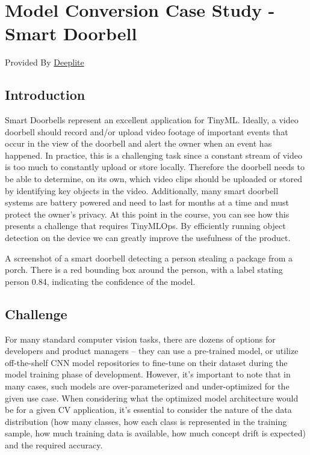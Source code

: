 {{{{{    
\section{Model Conversion Case Study - Smart Doorbell}

Provided By \href{}{Deeplite}

\subsection{Introduction}

    Smart Doorbells represent an excellent application for TinyML. Ideally, a video doorbell should record and/or upload video footage of important events that occur in the view of the doorbell and alert the owner when an event has happened. In practice, this is a challenging task since a constant stream of video is too much to constantly upload or store locally. Therefore the doorbell needs to be able to determine, on its own, which video clips should be uploaded or stored by identifying key objects in the video. Additionally, many smart doorbell systems are battery powered and need to last for months at a time and must protect the owner's privacy. At this point in the course, you can see how this presents a challenge that requires TinyMLOps. By efficiently running object detection on the device we can greatly improve the usefulness of the product.
    
    
    A screenshot of a smart doorbell detecting a person stealing a package from a porch. There is a red bounding box around the person, with a label stating person 0.84, indicating the confidence of the model.
    
    \subsection{Challenge}
    
    For many standard computer vision tasks, there are dozens of options for developers and product managers – they can use a pre-trained model, or utilize off-the-shelf CNN model repositories to fine-tune on their dataset during the model training phase of development. However, it’s important to note that in many cases, such models are over-parameterized and under-optimized for the given use case. When considering what the optimized model architecture would be for a given CV application, it’s essential to consider the nature of the data distribution (how many classes, how each class is represented in the training sample, how much training data is available, how much concept drift is expected) and the required accuracy.
    
}}}}}
